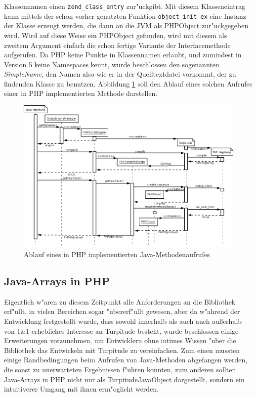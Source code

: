 Klassennamen einen \texttt{zend\_class\_entry} zur"uckgibt. Mit diesem Klasseneintrag kann mittels der schon vorher genutzten Funktion \texttt{object\_init\_ex}
eine Instanz der Klasse erzeugt werden, die dann an die JVM als PHPObject zur"uckgegeben wird. Wird auf diese Weise ein PHPObject gefunden, wird mit diesem
als zweitem Argument einfach die schon fertige Variante der Interfacemethode aufgerufen. Da PHP keine Punkte in Klassennamen erlaubt, und zumindest in
Version 5 keine Namespaces kennt, wurde beschlossen den sogenannten \emph{SimpleName}, den Namen also wie er in der Quelltextdatei vorkommt, der zu findenden Klasse 
zu benutzen. Abbildung \ref{fig:javaseq} soll den Ablauf eines solchen Aufrufes einer in PHP implementierten Methode darstellen. 

\begin{figure}[h]
\includegraphics[width=\textwidth]{chap1/img/javaseq.png}
\caption{Ablauf eines in PHP implementierten Java-Methodenaufrufes}
\label{fig:javaseq}
\end{figure}

\subsection{Java-Arrays in PHP}
\label{sec:chap1:impl:11}

Eigentlich w"aren zu diesem Zeitpunkt alle Anforderungen an die Bibliothek erf"ullt, in vielen Bereichen sogar "ubererf"ullt gewesen, aber da w"ahrend
der Entwicklung festgestellt wurde, dass sowohl innerhalb als auch auch au\ss erhalb von 1\&1 erhebliches Interesse an Turpitude besteht, wurde beschlossen 
einige Erweiterungen vorzunehmen, um Entwicklern ohne intimes Wissen "uber die Bibliothek das Entwickeln mit Turpitude zu vereinfachen.
Zum einen mussten einige Randbedingungen beim Aufrufen von Java-Methoden abgefangen werden, die sonst zu unerwarteten Ergebnissen f"uhren konnten, zum
anderen sollten Java-Arrays in PHP nicht nur als TurpitudeJavaObject dargestellt, sondern ein intuitiverer Umgang mit ihnen erm"oglicht werden.

